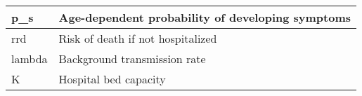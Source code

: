\begin{table}[tb!]
{\begin{tabular}{|l|l|}
            \hline
            p\_s          & Age-dependent probability of developing symptoms                           \\
            \hline
            rrd           & Risk of death if not hospitalized                                          \\
            \hline
            lambda        & Background transmission rate                                               \\
            \hline
            K             & Hospital bed capacity                                                      \\
            \hline
        \end{tabular}
    }
\end{table}

\begin{table}[tb!]
    \centering
    \caption{13 output parameters from the simulation performed by the ABC-SMC inference model.}
    \label{tab:output_param}
\end{table}
